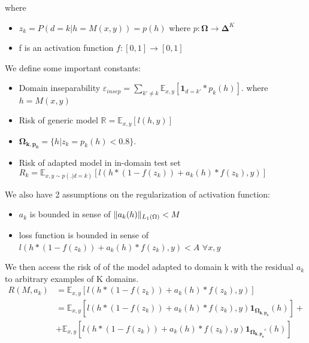 \documentclass[12pt,a4paper,twoside]{report}
\theoremstyle{definition}
\begin{document}
where 
\begin{itemize}
	\item $z_k = P(d=k | h=M(x,y)) = p(h)$ where $p: \mathbf{\Omega} \rightarrow \mathbf{\Delta}^{K}$
	\item f is an activation function $f: [0,1] \rightarrow [0,1]$ 
\end{itemize}
We define some important constants:
\begin{itemize}
	\item Domain inseparability $\mathbb{\varepsilon}_{insep} = \displaystyle{\mathop{\sum}_{k' \neq k} \mathbb{E}_{x,y}[\mathbf{1}_{d=k'}*p_k(h)]}$. where $h=M(x,y)$
	\item Risk of generic model $\mathbb{R} = \mathbb{E}_{x,y}[l(h,y)]$
	\item $\mathbf{\Omega_{k,p_{0}}} = \lbrace h | z_k = p_k(h)<0.8\rbrace$.
	\item Risk of adapted model in in-domain test set $R_k = \displaystyle{\mathbb{E}_{x,y \sim p(.|d=k)}[l(h * (1-f(z_k)) + a_k(h) * f(z_k), y)]}$
\end{itemize}
We also have 2 assumptions on the regularization of activation function:
\begin{itemize}
	\item $a_k$ is bounded in sense of $\normL{a_k(h)} < M$
	\item loss function is bounded in sense of $l(h * (1-f(z_k)) + a_k(h) * f(z_k),y) < A$ $\forall x,y$
\end{itemize}
We then access the risk of of the model adapted to domain k with the residual $a_k$ to arbitrary examples of K domains.
\begin{equation}
\begin{split}
R(M,a_k) &= \mathbb{E}_{x,y}[l(h * (1-f(z_k)) + a_k(h) * f(z_k),y)] \\
		&= \mathbb{E}_{x,y}[l(h * (1-f(z_k)) + a_k(h) * f(z_k),y)\mathbf{1}_{\mathbf{\Omega_{k,p_{0}}}}(h)] + \\
		&+ \mathbb{E}_{x,y}[l(h * (1-f(z_k)) + a_k(h) * f(z_k),y) \mathbf{1}_{\mathbf{\Omega_{k,p_{0}}}^{c}}(h)]
\end{split}
\end{equation}
\end{document}
